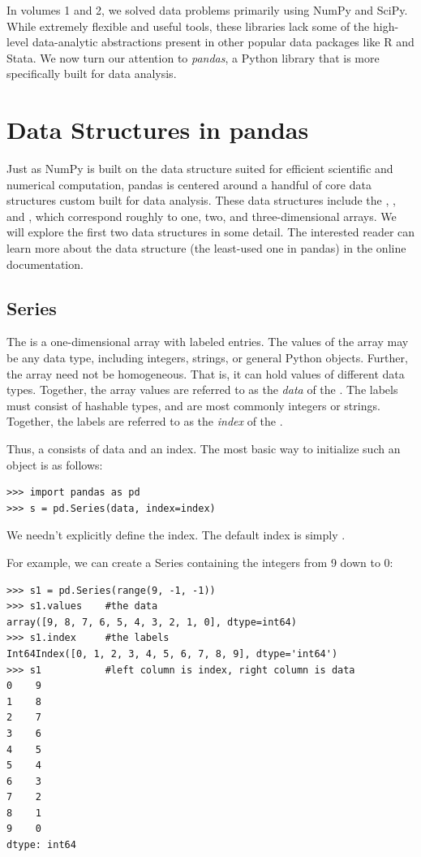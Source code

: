 \label{lab:pandas1}

In volumes 1 and 2, we solved data problems primarily using NumPy and SciPy.
While extremely flexible and useful tools, these libraries lack some of the high-level 
data-analytic abstractions present in other popular data packages like R and Stata.
We now turn our attention to \emph{pandas}, a Python library that is more specifically built
for data analysis.

\section*{Data Structures in pandas}
Just as NumPy is built on the  data structure suited for efficient scientific
and numerical computation, pandas is centered around a handful of core data structures
custom built for data analysis. These data structures include the , ,
and , which correspond roughly to one, two, and three-dimensional arrays.
We will explore the first two data structures in some detail.
The interested reader can learn more about the  data structure (the least-used one in pandas) in the online documentation.

\subsection*{Series}
The  is a one-dimensional array with labeled entries. The values of the array may be
any data type, including integers, strings, or general Python objects. Further, the array
need not be homogeneous. That is, it can hold values of different data types. Together,
the array values are referred to as the \emph{data} of the .
The labels must consist of hashable types, and are most commonly integers or strings.
Together, the labels are referred to as the \emph{index} of the .

Thus, a  consists of data and an index. The most basic way to initialize such an object
is as follows:
\begin{lstlisting}
>>> import pandas as pd
>>> s = pd.Series(data, index=index)
\end{lstlisting}
We needn't explicitly define the index. The default index is simply .

For example, we can create a Series containing the integers from 9 down to 0:
\begin{lstlisting}
>>> s1 = pd.Series(range(9, -1, -1))
>>> s1.values    #the data
array([9, 8, 7, 6, 5, 4, 3, 2, 1, 0], dtype=int64)
>>> s1.index     #the labels
Int64Index([0, 1, 2, 3, 4, 5, 6, 7, 8, 9], dtype='int64')
>>> s1           #left column is index, right column is data
0    9
1    8
2    7
3    6
4    5
5    4
6    3
7    2
8    1
9    0
dtype: int64
\end{lstlisting}


